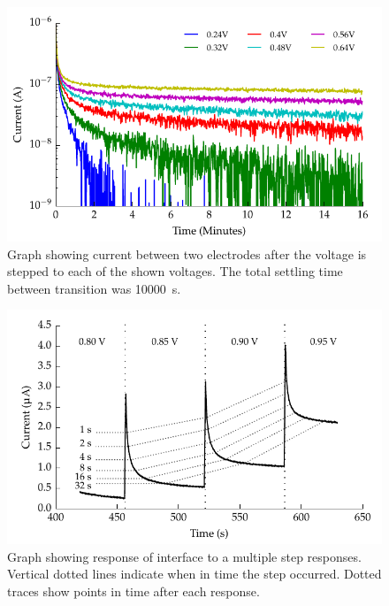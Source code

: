         

      \begin{figure}
        \centering
        \includegraphics{content/pt2/08-InterfaceParameters/graphics/graph_longsweep_CPE}
        \caption{\label{fig:graph_longsweep_CPE}Graph showing current between two electrodes after the voltage is stepped to each of the shown voltages. The total settling time between transition was \SI{10000}{\second}.}
      \end{figure}

      \begin{figure}
        \centering
        \includegraphics{content/pt2/08-InterfaceParameters/graphics/graph_64s_stirred}
        \caption{\label{fig:pt2-faradaic_decay}Graph showing response of interface to a multiple step responses. Vertical dotted lines indicate when in time the step occurred. Dotted traces show points in time after each response.}
      \end{figure}



